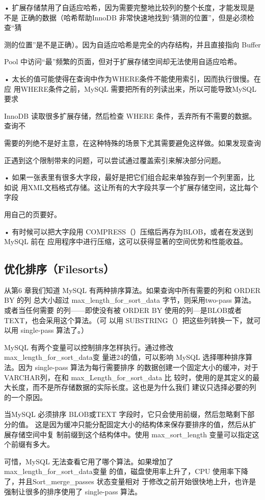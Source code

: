 • 扩展存储禁用了自适应哈希，因为需要完整地比较列的整个长度，才能发现是不是
正确的数据（哈希帮助InnoDB 非常快速地找到“猜测的位置”，但是必须检查“猜

测的位置”是不是正确）。因为自适应哈希是完全的内存结构，并且直接指向 Buffer

Pool 中访问“最”频繁的页面，但对于扩展存储空间却无法使用自适应哈希。

• 太长的值可能使得在查询中作为WHERE条件不能使用索引，因而执行很慢。在应
用WHERE条件之前，MySQL 需要把所有的列读出来，所以可能导致MySQL 要求

InnoDB 读取很多扩展存储，然后检查 WHERE 条件，丢弃所有不需要的数据。查询不

需要的列绝不是好主意，在这种特殊的场景下尤其需要避免这样做。如果发现查询

正遇到这个限制带来的问题，可以尝试通过覆盖索引来解决部分问题。

• 如果一张表里有很多大字段，最好是把它们组合起来单独存到一个列里面，比如说
用XML文档格式存储。这让所有的大字段共享一个扩展存储空间，这比每个字段

用自己的页要好。

• 有时候可以把大字段用 COMPRESS（）压缩后再存为BLOB，或者在发送到MySQL 前在
应用程序中进行压缩，这可以获得显著的空间优势和性能收益。

\subsection{优化排序（Filesorts）}
从第6 章我们知道 MySQL 有两种排序算法。如果查询中所有需要的列和 ORDER BY 的列
总大小超过 max\_length\_for\_sort\_data 字节，则采用two-pass 算法。或者当任何需要
的列——即使没有被 ORDER BY 使用的列—是BLOB或者TEXT，也会采用这个算法。（可
以用 SUBSTRING（）把这些列转换一下，就可以用 single-pass 算法了。）

MySQL 有两个变量可以控制排序怎样执行。通过修改max\_length\_for\_sort\_data变
量进24的值，可以影响 MySQL 选择哪种排序算法。因为 single-pass 算法为每行需要排序
的数据创建一个固定大小的缓冲，对于 VARCHAR列，在和 max\_Length\_for\_sort\_data 比
较时，使用的是其定义的最大长度，而不是所存储数据的实际长度。这也是为什么我们
建议只选择必要的列的一个原因。

当MySQL 必须排序 BLOB或TEXT 字段时，它只会使用前缀，然后忽略剩下部分的值。
这是因为缓冲只能分配固定大小的结构体来保存要排序的值，然后从扩展存储空间中复
制前缀到这个结构体中。使用 max\_sort\_length 变量可以指定这个前缀有多大。

可惜，MySQL 无法查看它用了哪个算法。如果增加了max\_length\_for\_sort\_data变量
的值，磁盘使用率上升了，CPU 使用率下降了，并且Sort\_merge\_passes 状态变量相对
于修改之前开始很快地上升，也许是强制让很多的排序使用了 single-pass 算法。

